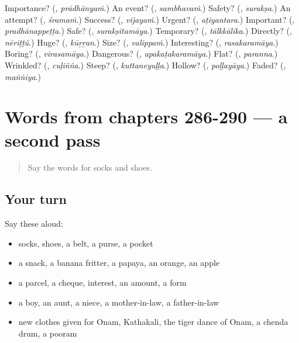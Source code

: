 \begin{tcolorbox}[breakable,colback=teal!4,colframe=teal!35!black,title={Before you move on}]
Importance? (\textbf{}, \emph{prādhānyaṁ}.) An event? (\textbf{}, \emph{sambhavaṁ}.) Safety? (\textbf{}, \emph{surakṣa}.) An attempt? (\textbf{}, \emph{śramaṁ}.) Success? (\textbf{}, \emph{vijayaṁ}.) Urgent? (\textbf{}, \emph{aṭiyantara}.) Important? (\textbf{}, \emph{pradhānappeṭṭa}.) Safe? (\textbf{}, \emph{surakṣitamāya}.) Temporary? (\textbf{}, \emph{tālkkālika}.) Directly? (\textbf{}, \emph{nēriṭṭŭ}.) Huge? (\textbf{}, \emph{kūṟṟan}.) Size? (\textbf{}, \emph{valippaṁ}.) Interesting? (\textbf{}, \emph{rasakaramāya}.) Boring? (\textbf{}, \emph{virasamāya}.) Dangerous? (\textbf{}, \emph{apakaṭakaramāya}.) Flat? (\textbf{}, \emph{paranna}.) Wrinkled? (\textbf{}, \emph{cuḷiñña}.) Steep? (\textbf{}, \emph{kuttaneyuḷḷa}.) Hollow? (\textbf{}, \emph{poḷḷayāya}.) Faded? (\textbf{}, \emph{maṅṅiya}.)
\end{tcolorbox}
\section[(dialogue)]{Words from chapters 286-290 — a second pass}

\label{lesson:ML-R290-second-pass-words-from-chapters-286-290}



\begin{quote}
Say the words for socks and shoes.
\end{quote}

\subsection*{Your turn}
Say these aloud:

\begin{itemize}
\raggedright
  \item socks, shoes, a belt, a purse, a pocket
  \item a snack, a banana fritter, a papaya, an orange, an apple
  \item a parcel, a cheque, interest, an amount, a form
  \item a boy, an aunt, a niece, a mother-in-law, a father-in-law
  \item new clothes given for Onam, Kathakali, the tiger dance of Onam, a chenda drum, a pooram
\end{itemize}

